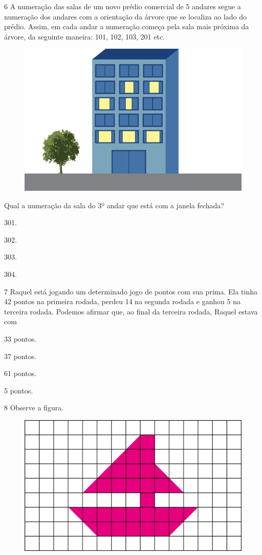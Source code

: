 \num{6} A numeração das salas de um novo prédio comercial de 5 andares segue a
numeração dos andares com a orientação da árvore que se localiza ao
lado do prédio. Assim, em cada andar a numeração começa pela sala mais
próxima da árvore, da seguinte maneira: 101, 102, 103, 201 etc.

\begin{figure}[htpb!]
\centering
\includegraphics[width=.5\textwidth]{./media/image93.png}
\end{figure}

Qual a numeração da sala do 3º andar que está com a janela fechada?

\begin{escolha}
\item
  301.
\item
  302.
\item
  303.
\item
  304.
\end{escolha}

\num{7} Raquel está jogando um determinado jogo de pontos com sua prima. Ela
tinha 42 pontos na primeira rodada, perdeu 14 na segunda rodada e ganhou
5 na terceira rodada. Podemos afirmar que, ao final da terceira rodada, Raquel estava com

\begin{escolha}
\item
  33 pontos.
\item
  37 pontos.
\item
  61 pontos.
\item
  5 pontos.
\end{escolha}

\num{8} Observe a figura.

\begin{figure}[htpb!]
\centering
\includegraphics[width=.6\textwidth]{./media/image94.png}
\end{figure}

